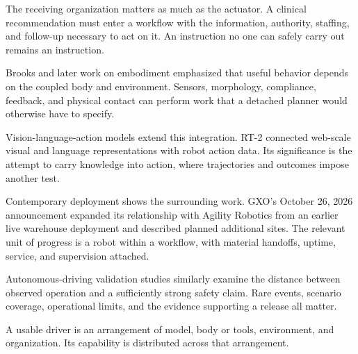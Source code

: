 The receiving organization matters as much as the actuator. A clinical recommendation must enter a workflow with the information, authority, staffing, and follow-up necessary to act on it. An instruction no one can safely carry out remains an instruction.


Brooks and later work on embodiment emphasized that useful behavior depends on the coupled body and environment.\cite{brooks1991,pfeifer2006} Sensors, morphology, compliance, feedback, and physical contact can perform work that a detached planner would otherwise have to specify.

Vision-language-action models extend this integration. RT-2 connected web-scale visual and language representations with robot action data.\cite{zitkovich2023} Its significance is the attempt to carry knowledge into action, where trajectories and outcomes impose another test.

Contemporary deployment shows the surrounding work. GXO's October 26, 2026 announcement expanded its relationship with Agility Robotics from an earlier live warehouse deployment and described planned additional sites.\cite{gxo2026digit} The relevant unit of progress is a robot within a workflow, with material handoffs, uptime, service, and supervision attached.

Autonomous-driving validation studies similarly examine the distance between observed operation and a sufficiently strong safety claim.\cite{kalra2016,koopman2016} Rare events, scenario coverage, operational limits, and the evidence supporting a release all matter.

A usable driver is an arrangement of model, body or tools, environment, and organization. Its capability is distributed across that arrangement.
